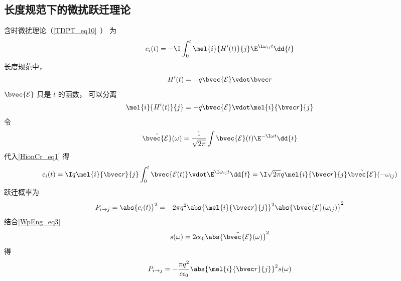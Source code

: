 \subsection{长度规范下的微扰跃迁理论}
含时微扰理论（\autoref{TDPT_eq10}~） 为
\begin{equation}\label{HionCr_eq1}
c_i(t) = -\I \int_0^t \mel{i}{H'(t)}{j} \E^{\I\omega_{ij} t} \dd{t}
\end{equation}
长度规范中，
\begin{equation}
H'(t) = -q\bvec {\mathcal E} \vdot \bvec r
\end{equation}
$\bvec {\mathcal E}$ 只是 $t$ 的函数， 可以分离
\begin{equation}
\mel{i}{H'(t)}{j} = -q\bvec {\mathcal E} \vdot \mel{i}{\bvec r}{j}
\end{equation}
令
\begin{equation}
\tilde {\bvec {\mathcal E}}(\omega) = \frac{1}{\sqrt{2\pi}} \int \bvec {\mathcal E}(t) \E^{-\I\omega t} \dd{t}
\end{equation}
代入\autoref{HionCr_eq1} 得
\begin{equation}
c_i(t) = \I q \mel{i}{\bvec r}{j} \int_0^t \bvec {\mathcal E(t)} \vdot  \E^{\I\omega_{ij} t} \dd{t} = \I \sqrt{2\pi} q \mel{i}{\bvec r}{j} \tilde {\bvec {\mathcal E}}(-\omega_{ij})
\end{equation}
跃迁概率为
\begin{equation}\label{HionCr_eq2}
P_{i\to j} = \abs{c_i(t)}^2 = -2\pi q^2 \abs{\mel{i}{\bvec r}{j}}^2 \abs{\tilde {\bvec {\mathcal E}}(\omega_{ij})}^2
\end{equation}
结合\autoref{WpEng_eq3}~
\begin{equation}
s(\omega) = 2c\epsilon_0 \abs{\tilde {\bvec {\mathcal E}}(\omega)}^2
\end{equation}
得
\begin{equation}
P_{i\to j} = -\frac{\pi q^2}{c\epsilon_0} \abs{\mel{i}{\bvec r}{j}}^2 s(\omega)
\end{equation}

